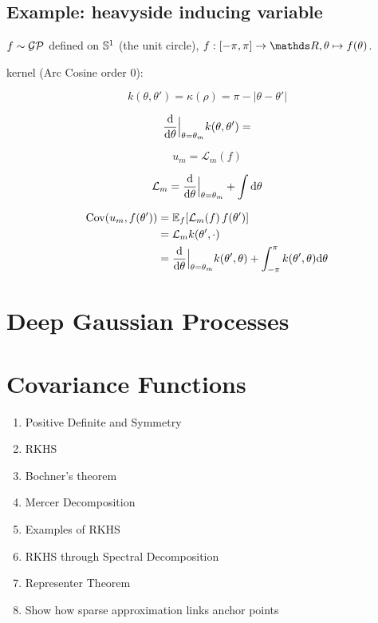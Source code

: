 \subsection{Example: heavyside inducing variable}

$f \sim \mathcal{GP}$ defined on $\mathbb{S}^1$ (the unit circle), $f: [-\pi, \pi] \rightarrow \Reals, \theta \mapsto f(\theta)$.

kernel (Arc Cosine order 0):

\begin{equation}
  k(\theta, \theta') = \kappa(\rho) = \pi - |\theta - \theta'|
\end{equation}

\begin{equation}
  \frac{\mathrm{d}{}}{\mathrm{d}{\theta}}\Bigr|_{\theta = \theta_m} k(\theta, \theta') = 
\end{equation}

\begin{equation}
  u_m = \mathcal{L}_m(f)
\end{equation}

\begin{equation}
  \mathcal{L}_m = \frac{\mathrm{d}{}}{\mathrm{d}{\theta}}\Bigr|_{\theta = \theta_m} + \int \mathrm{d}{\theta}
\end{equation}

\begin{align}
  \Cov(u_m, f(\theta')) &= \Exp{f}{\mathcal{L}_m(f)\,f(\theta')} \\
                      &=  \mathcal{L}_m k(\theta', \cdot) \\
                      &= \frac{\calcd{}}{\calcd{\theta}}\Bigr|_{\theta = \theta_m} k(\theta', \theta) + \int_{-\pi}^\pi k(\theta', \theta) \calcd{\theta}
\end{align}



\section{Deep Gaussian Processes}



\section{Covariance Functions}

\begin{enumerate}
  \item Positive Definite and Symmetry
  \item RKHS
  \item Bochner's theorem
  \item Mercer Decomposition
  \item Examples of RKHS
  \item RKHS through Spectral Decomposition
  \item Representer Theorem
  \item Show how sparse approximation links anchor points
\end{enumerate}
